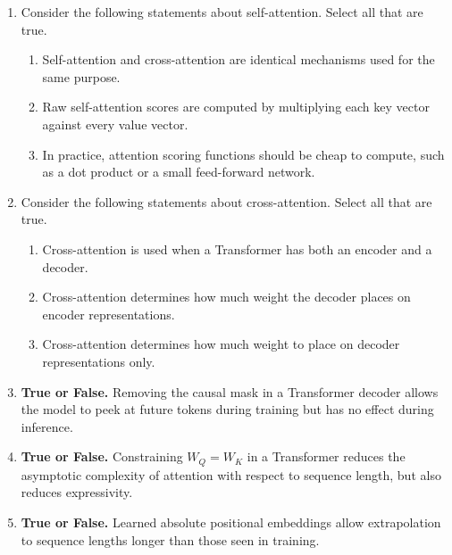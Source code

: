 \begin{enumerate}[label=(\alph*)]
\item Consider the following statements about self-attention. Select all that are true.
\begin{enumerate}[label=\alph*.]
\item Self-attention and cross-attention are identical mechanisms used for the same purpose.
\item Raw self-attention scores are computed by multiplying each key vector against every value vector.
\item In practice, attention scoring functions should be cheap to compute, such as a dot product or a small feed-forward network.
\end{enumerate}

\item Consider the following statements about cross-attention. Select all that are true.
\begin{enumerate}[label=\alph*.]
\item Cross-attention is used when a Transformer has both an encoder and a decoder.
\item Cross-attention determines how much weight the decoder places on encoder representations.
\item Cross-attention determines how much weight to place on decoder representations only.
\end{enumerate}

\item \textbf{True or False.} Removing the causal mask in a Transformer decoder allows the model to peek at future tokens during training but has no effect during inference.

\item \textbf{True or False.} Constraining \(W_Q = W_K\) in a Transformer reduces the asymptotic complexity of attention with respect to sequence length, but also reduces expressivity.

\item \textbf{True or False.} Learned absolute positional embeddings allow extrapolation to sequence lengths longer than those seen in training.
\end{enumerate}


